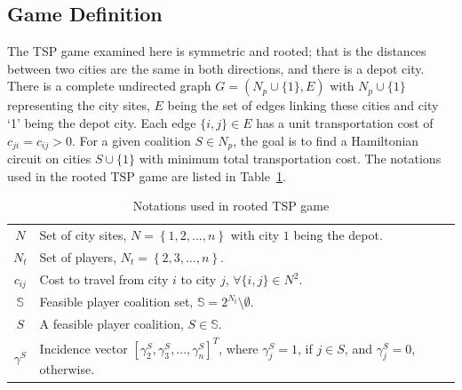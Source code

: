 \documentclass[authoryear,review,12pt]{elsarticle}
\begin{document}
\subsection{Game Definition}
The TSP game examined here is symmetric and rooted; that is the distances between two cities are the same in both directions, and there is a depot city.
There is a complete undirected graph $G = (N_p \cup \{1\},E)$ with $N_p \cup \{1\}$ representing the city sites, $E$ being the set of edges linking these cities and city `1' being the depot city. Each edge $\{i,j\} \in E$ has a unit transportation cost of $c_{ji} = c_{ij} > 0$.
For a given coalition $S \in N_p$, the goal is to find a Hamiltonian circuit on cities $S \cup \{1\}$ with minimum total transportation cost. The notations used in the rooted TSP game are listed in Table~\ref{table:TSnotation}.
\begin{table}[H]
\tabcolsep=25pt
\renewcommand\arraystretch{1.25}
\caption{\label{table:TSnotation} Notations used in rooted TSP game}
\begin{tabular}[H]{c c}
\hline
\multicolumn{1}{c}{$N$} &\multicolumn{1}{l}{Set of city sites, $N=\left\{1,2,...,n\right\}$ with city $1$ being the depot.}\\
\multicolumn{1}{c}{$N_t$} &\multicolumn{1}{l}{Set of players, $N_t=\left\{2,3,...,n\right\}$.}\\
\multicolumn{1}{c}{$c_{ij}$} &\multicolumn{1}{l}{Cost to travel from city $i$ to city $j$, $\forall \{i,j\} \in N^2$.}\\
\multicolumn{1}{c}{$\mathbb{S}$} &\multicolumn{1}{l}{Feasible player coalition set, $\mathbb{S} = 2^{N_t} \setminus \emptyset$.}\\
\multicolumn{1}{c}{$S$} &\multicolumn{1}{l}{A feasible player coalition, $S \in \mathbb{S}$.}\\
\multicolumn{1}{c}{$\gamma^S$} &\multicolumn{1}{l}{Incidence vector $\left[ \gamma^{S}_2,\gamma^{S}_3,...,\gamma^{S}_{n} \right]^T$, where $\gamma^{S}_j=1$, if $j \in S$, and $\gamma^{S}_j=0$, otherwise.}\\
\hline
\end{tabular}
\end{table}
\end{document}
